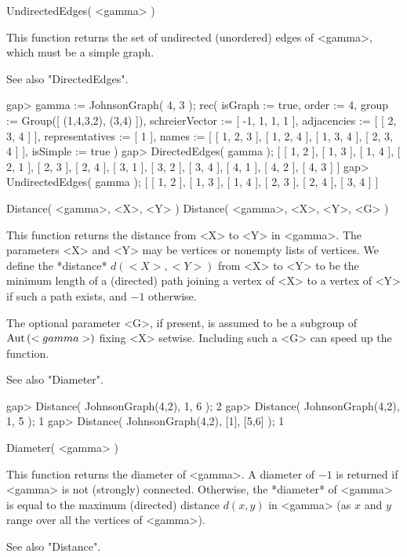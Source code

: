 \>UndirectedEdges( <gamma> )

This function returns the set of undirected (unordered) edges of <gamma>,
which must be a simple graph.

See also "DirectedEdges".

\beginexample
gap> gamma := JohnsonGraph( 4, 3 );
rec( isGraph := true, order := 4, group := Group([ (1,4,3,2), (3,4) ]), 
  schreierVector := [ -1, 1, 1, 1 ], adjacencies := [ [ 2, 3, 4 ] ], 
  representatives := [ 1 ], 
  names := [ [ 1, 2, 3 ], [ 1, 2, 4 ], [ 1, 3, 4 ], [ 2, 3, 4 ] ], 
  isSimple := true )
gap> DirectedEdges( gamma );
[ [ 1, 2 ], [ 1, 3 ], [ 1, 4 ], [ 2, 1 ], [ 2, 3 ], [ 2, 4 ], [ 3, 1 ], 
  [ 3, 2 ], [ 3, 4 ], [ 4, 1 ], [ 4, 2 ], [ 4, 3 ] ]
gap> UndirectedEdges( gamma );
[ [ 1, 2 ], [ 1, 3 ], [ 1, 4 ], [ 2, 3 ], [ 2, 4 ], [ 3, 4 ] ]
\endexample                                                                    


\>Distance( <gamma>, <X>, <Y> )
\>Distance( <gamma>, <X>, <Y>, <G> )

This function returns the distance from <X> to <Y> in <gamma>. The
parameters <X> and <Y> may be vertices or nonempty lists of vertices.
We define the *distance* $d(<X>,<Y>)$ from <X> to <Y> to be the minimum
length of a (directed) path joining a vertex of <X> to a vertex of <Y>
if such a path exists, and $-1$ otherwise.

The  optional parameter <G>,  if present, is assumed to  be a subgroup of
${\rm Aut}\,(<gamma>)$ fixing  <X>  setwise.  Including  such a <G> can speed up
the function.

See also "Diameter".

\beginexample
gap> Distance( JohnsonGraph(4,2), 1, 6 );
2
gap> Distance( JohnsonGraph(4,2), 1, 5 );
1 
gap> Distance( JohnsonGraph(4,2), [1], [5,6] );
1
\endexample


\>Diameter( <gamma> )

This  function  returns the  diameter of <gamma>.  A diameter of $-1$
is returned if <gamma> is not (strongly) connected.  Otherwise, the
*diameter* of <gamma> is equal to the maximum (directed) distance
$d(x,y)$ in <gamma> (as $x$ and $y$ range over all the vertices of 
<gamma>).

See also "Distance".

